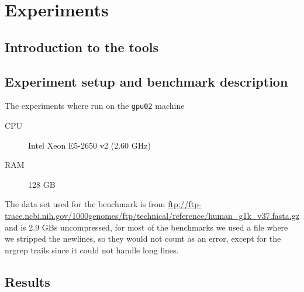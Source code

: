 \section{Experiments}

\subsection{Introduction to the tools}


\subsection{Experiment setup and benchmark description}
The experiments where run on the \texttt{gpu02} machine
\begin{description}
    \item[CPU] Intel Xeon E5-2650 v2 (2.60 GHz)
    \item[RAM] 128 GB
\end{description}

The data set used for the benchmark is from
\url{ftp://ftp-trace.ncbi.nih.gov/1000genomes/ftp/technical/reference/human_g1k_v37.fasta.gz}
and is 2.9 GBs uncompressed, for most of the benchmarks we used a file where we
stripped the newlines, so they would not count as an error, except for the
nrgrep trails since it could not handle long lines.


\subsection{Results}

